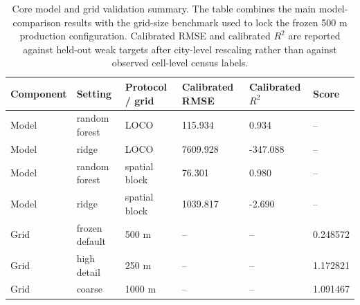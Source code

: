 \begin{table}[H]
\centering
\caption{Core model and grid validation summary. The table combines the main model-comparison results with the grid-size benchmark used to lock the frozen 500 m production configuration. Calibrated RMSE and calibrated $R^2$ are reported against held-out weak targets after city-level rescaling rather than against observed cell-level census labels.}
\label{tab:core-validation}
\begin{tabular}{llllll}
\toprule
Component & Setting & Protocol / grid & Calibrated RMSE & Calibrated $R^2$ & Score \\
\midrule
Model & random forest & LOCO & 115.934 & 0.934 & -- \\
Model & ridge & LOCO & 7609.928 & -347.088 & -- \\
Model & random forest & spatial block & 76.301 & 0.980 & -- \\
Model & ridge & spatial block & 1039.817 & -2.690 & -- \\
\midrule
Grid & frozen default & 500 m & -- & -- & 0.248572 \\
Grid & high detail & 250 m & -- & -- & 1.172821 \\
Grid & coarse & 1000 m & -- & -- & 1.091467 \\
\bottomrule
\end{tabular}
\end{table}
